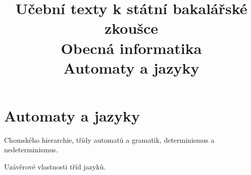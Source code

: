 \clearpage  \clearpage
\title{\LARGE Učební texty k státní bakalářské zkoušce \\ Obecná informatika \\ Automaty a jazyky}

\maketitle
\newpage
\setcounter{section}{1}
\section{Automaty a jazyky}
\begin{pozadavky}
\begin{pitemize}
\item Chomského hierarchie, třídy automatů a gramatik, determinismus a nedeterminismus.
\item Uzávěrové vlastnosti tříd jazyků.
\end{pitemize}
\end{pozadavky}




